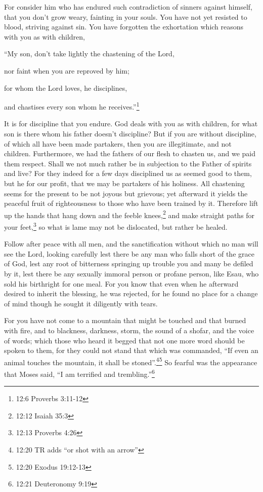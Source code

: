 \myverse{}For consider him who has endured such contradiction of sinners
against himself, that you don’t grow weary, fainting in your souls.
\myverse{}You have not yet resisted to blood, striving against sin.
\myverse{}You have forgotten the exhortation which reasons with you as with children,

“My son, don’t take lightly the chastening of the Lord,

nor faint when you are reproved by him;

\myverse{}for whom the Lord loves, he disciplines,

and chastises every son whom he receives.”\footnote{12:6 Proverbs 3:11-12}

\myverse{}It is for discipline that you endure. God deals with you as with
children, for what son is there whom his father doesn’t discipline?
\myverse{}But if you are without discipline, of which all have been made partakers, then
you are illegitimate, and not children.
\myverse{}Furthermore, we had the fathers of our flesh to chasten us, and we paid them
respect. Shall we not much rather be in subjection to the Father of spirits and live?
\myverse{}For they indeed for a few days disciplined us as seemed good to them, but
he for our profit, that we may be partakers of his holiness.
\myverse{}All chastening seems for the present to be not joyous but grievous; yet afterward
it yields the peaceful fruit of righteousness to those who have been trained by it.
\myverse{}Therefore lift up the hands that hang down and the feeble knees,\footnote{12:12 Isaiah 35:3}
\myverse{}and make straight paths for your feet,\footnote{12:13 Proverbs 4:26} so what is lame may not be dislocated, but rather
be healed.

\myverse{}Follow after peace with all men, and the sanctification without
which no man will see the Lord,
\myverse{}looking carefully lest there be any man who falls short of the grace of God,
lest any root of bitterness springing up trouble you and many be defiled by it,
\myverse{}lest there be any sexually immoral person or profane person, like Esau, who
sold his birthright for one meal.
\myverse{}For you know that even when he afterward desired to inherit the blessing,
he was rejected, for he found no place for a change of mind though he sought it diligently with tears.

\myverse{}For you have not come to a mountain that might be touched and
that burned with fire, and to blackness, darkness, storm,
\myverse{}the sound of a shofar, and the voice of words; which those who heard it begged
that not one more word should be spoken to them,
\myverse{}for they could not stand that which was commanded, “If even an animal touches
the mountain, it shall be stoned”.\footnote{12:20 TR adds “or shot with an arrow”}\footnote{12:20 Exodus 19:12-13}
\myverse{}So fearful was the appearance that Moses said, “I am terrified and trembling.”\footnote{12:21 Deuteronomy 9:19}


